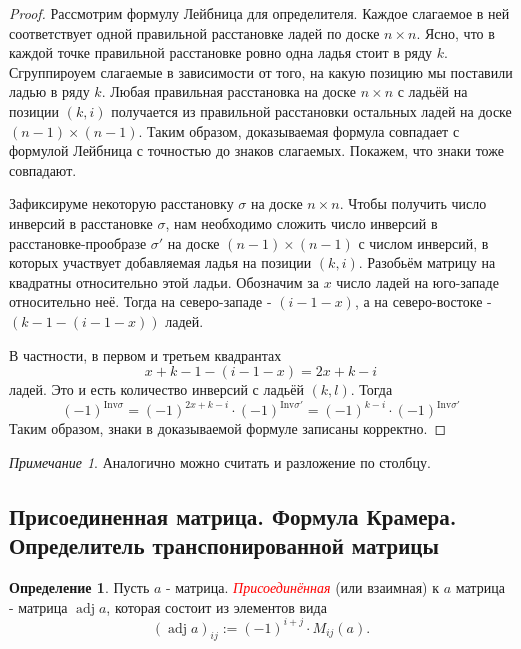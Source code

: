 \documentclass[a4paper,100pt]{article}
\theoremstyle{indented}
\theoremstyle{definition}
\newtheorem{defn}{Определение}
\theoremstyle{remark}
\newtheorem{remark}{Примечание}
\DeclareMathOperator{\adj}{adj}
\begin{document}
\begin{proof}
    Рассмотрим формулу Лейбница для определителя. Каждое слагаемое в ней соответствует одной правильной расстановке ладей по доске $n\times n$. Ясно, что в каждой точке правильной расстановке ровно одна ладья стоит в ряду $k$. Сгруппироуем слагаемые в зависимости от того, на какую позицию мы поставили ладью в ряду $k$. Любая правильная расстановка на доске $n\times n$ с ладьёй на позиции $(k, i)$ получается из правильной расстановки остальных ладей на доске $(n-1)\times(n-1)$. Таким образом, доказываемая формула совпадает с формулой Лейбница с точностью до знаков слагаемых. Покажем, что знаки тоже совпадают.\ 

    Зафиксируме некоторую расстановку $\sigma$ на доске $n\times n$. Чтобы получить число инверсий в расстановке $\sigma$, нам необходимо сложить число инверсий в расстановке-прообразе $\sigma '$ на доске $(n-1)\times (n-1)$ с числом инверсий, в которых участвует добавляемая ладья на позиции $(k, i)$. Разобьём матрицу на квадратны относительно этой ладьи. Обозначим за $x$ число ладей на юго-западе относительно неё. Тогда на северо-западе - $(i-1-x)$, а на северо-востоке - $(k-1-(i-1-x))$ ладей.\ 

    В частности, в первом и третьем квадрантах 
    \[
        x+k-1-(i-1-x)=2x+k-i
    \]
    ладей. Это и есть количество инверсий с ладьёй $(k,l)$. Тогда 
    \[
        (-1)^{\text{Inv}\sigma}=(-1)^{2x+k-i}\cdot(-1)^{\text{Inv}\sigma'}=(-1)^{k-i}\cdot(-1)^{\text{Inv}\sigma'}
    \]
    Таким образом, знаки в доказываемой формуле записаны корректно.
\end{proof}

\begin{remark}
    Аналогично можно считать и разложение по столбцу.
\end{remark}

\resetall

\subsection{Присоединенная матрица. Формула Крамера. Определитель транспонированной матрицы}

\begin{defn}
    Пусть $a$ - матрица. \hypertarget{n101}{\textcolor{red}{\textit{Присоединённая}}} (или взаимная) к $a$ матрица - матрица $\adj a$, которая состоит из элементов вида 
    \[
        (\adj a)_{ij}:=(-1)^{i+j}\cdot M_{ij}(a).
    \]
\end{defn}
\end{document}
